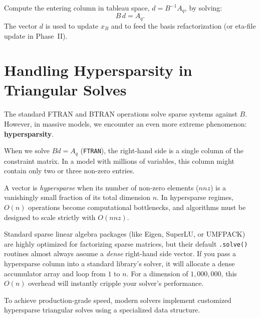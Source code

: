 \documentclass[11pt, a4paper]{article}
\begin{document}
\begin{algostep}
Compute the entering column in tableau space, $d = B^{-1}A_q$, by solving:
\[
B\,d = A_q.
\]
The vector $d$ is used to update $x_B$ and to feed the basis refactorization (or eta-file update in Phase~II).
\end{algostep}

\section{Handling Hypersparsity in Triangular Solves}

The standard FTRAN and BTRAN operations solve sparse systems against $B$. However, in massive models, we encounter an even more extreme phenomenon: \textbf{hypersparsity}.

When we solve $B d = A_q$ (\texttt{FTRAN}), the right-hand side is a single column of the constraint matrix. In a model with millions of variables, this column might contain only two or three non-zero entries. 

\begin{definition}[Hypersparsity]
A vector is \emph{hypersparse} when its number of non-zero elements ($nnz$) is a vanishingly small fraction of its total dimension $n$. In hypersparse regimes, $O(n)$ operations become computational bottlenecks, and algorithms must be designed to scale strictly with $O(nnz)$.
\end{definition}

\begin{warning}
Standard sparse linear algebra packages (like Eigen, SuperLU, or UMFPACK) are highly optimized for factorizing sparse matrices, but their default \texttt{.solve()} routines almost always assume a \emph{dense} right-hand side vector. If you pass a hypersparse column into a standard library's solver, it will allocate a dense accumulator array and loop from $1$ to $n$. For a dimension of $1{,}000{,}000$, this $O(n)$ overhead will instantly cripple your solver's performance.
\end{warning}

To achieve production-grade speed, modern solvers implement customized hypersparse triangular solves using a specialized data structure.

\end{document}
